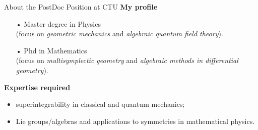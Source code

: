 \documentclass[handout,10pt]{beamer}
\begin{document}

\begin{frame}{About the PostDoc Position at CTU}
\textbf{My profile}
\vspace{1em}
\begin{itemize}
	\item[•] Master degree in Physics \\ 
	\small \qquad(focus on \emph{geometric mechanics} and \emph{algebraic quantum field theory}).
	\item[•] Phd in Mathematics \\
	\small \qquad (focus on \emph{multisymplectic geometry} and \emph{algebraic methods in differential geometry}).	
\end{itemize}

\pause
\vfill
\textbf{Expertise required}
\vspace{1em}
\begin{itemize}
	\setlength\itemsep{1em}
	\item superintegrability in classical and quantum mechanics;
	\item\alert<3->{Lie groups/algebras and applications to symmetries in mathematical physics.}
\end{itemize}
\vfill
\end{frame}
\end{document}
